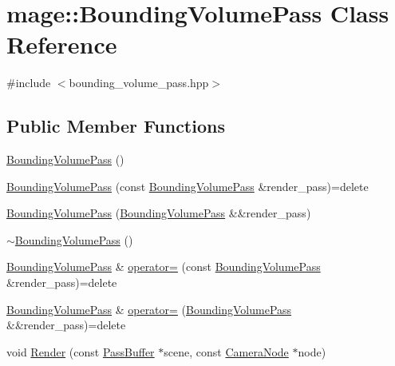 \hypertarget{classmage_1_1_bounding_volume_pass}{}\section{mage\+:\+:Bounding\+Volume\+Pass Class Reference}
\label{classmage_1_1_bounding_volume_pass}


{\ttfamily \#include $<$bounding\+\_\+volume\+\_\+pass.\+hpp$>$}

\subsection*{Public Member Functions}
\begin{DoxyCompactItemize}
\item 
\hyperlink{classmage_1_1_bounding_volume_pass_ab32eb9086e463f5260f8999b78b55b26}{Bounding\+Volume\+Pass} ()
\item 
\hyperlink{classmage_1_1_bounding_volume_pass_a21408cc53051c9c6d94efe41b3bea404}{Bounding\+Volume\+Pass} (const \hyperlink{classmage_1_1_bounding_volume_pass}{Bounding\+Volume\+Pass} \&render\+\_\+pass)=delete
\item 
\hyperlink{classmage_1_1_bounding_volume_pass_a4c40fde630e6ff9bf466293c7bc94157}{Bounding\+Volume\+Pass} (\hyperlink{classmage_1_1_bounding_volume_pass}{Bounding\+Volume\+Pass} \&\&render\+\_\+pass)
\item 
\hyperlink{classmage_1_1_bounding_volume_pass_a41dc433aed26f05e8b60462a6e337509}{$\sim$\+Bounding\+Volume\+Pass} ()
\item 
\hyperlink{classmage_1_1_bounding_volume_pass}{Bounding\+Volume\+Pass} \& \hyperlink{classmage_1_1_bounding_volume_pass_a2115e9af06e0bc7e42fc95e10f0dacad}{operator=} (const \hyperlink{classmage_1_1_bounding_volume_pass}{Bounding\+Volume\+Pass} \&render\+\_\+pass)=delete
\item 
\hyperlink{classmage_1_1_bounding_volume_pass}{Bounding\+Volume\+Pass} \& \hyperlink{classmage_1_1_bounding_volume_pass_a3887d5ffbb5e175187004f0b057ddcaa}{operator=} (\hyperlink{classmage_1_1_bounding_volume_pass}{Bounding\+Volume\+Pass} \&\&render\+\_\+pass)=delete
\item 
void \hyperlink{classmage_1_1_bounding_volume_pass_a080c5ff2f2f8038e48e6338d9c8f3ebe}{Render} (const \hyperlink{structmage_1_1_pass_buffer}{Pass\+Buffer} $\ast$scene, const \hyperlink{classmage_1_1_camera_node}{Camera\+Node} $\ast$node)
\end{DoxyCompactItemize}
